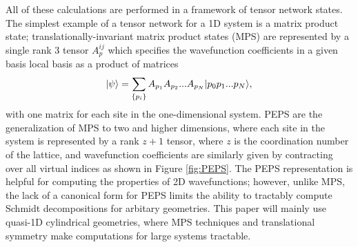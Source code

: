 All of these calculations are performed in a framework of tensor network states.
The simplest example of a tensor network for a 1D system is a matrix
product state; translationally-invariant matrix product states (MPS)
are represented by a single rank 3 tensor $A_p^{ij}$ which specifies
the wavefunction coefficients in a given basis local basis as a
product of matrices $$\vert \psi \rangle = \sum\limits_{\{p_i\}} A_{p_1}
A_{p_2} ... A_{p_N} \vert p_0 p_1 ... p_N \rangle,$$ with one matrix for each
site in the one-dimensional system.
PEPS are the generalization of MPS to two and higher dimensions, where
each site in the system is represented by a rank $z+1$ tensor, where
$z$ is the coordination number of the lattice, and wavefunction
coefficients are similarly given by contracting over all virtual
indices as shown in Figure \ref{fig:PEPS}.\cite{verstraete2004}
The PEPS representation is helpful for computing the properties of 2D wavefunctions; however, unlike MPS, the lack of a canonical form for PEPS limits the ability to tractably compute Schmidt decompositions for arbitary geometries. This paper will mainly use quasi-1D cylindrical geometries, where  MPS techniques and translational symmetry make computations for large systems tractable.
